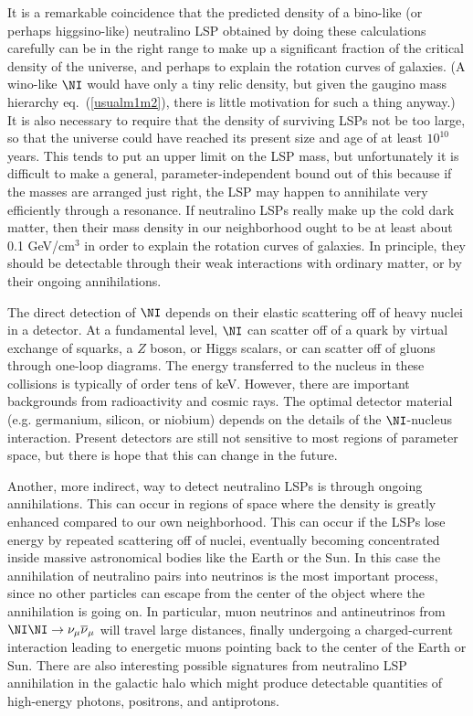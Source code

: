 It is a remarkable coincidence that the predicted density of
a bino-like (or perhaps higgsino-like) neutralino LSP obtained by
doing these calculations carefully can be in the right range to
make up a significant fraction of the critical density of the universe, 
and perhaps to
explain the rotation curves of galaxies.\cite{darkmatterreviews} (A
wino-like $\NI$ would
have only a tiny relic density, but given the gaugino mass hierarchy
eq.~(\ref{usualm1m2}), there is little motivation for such a thing
anyway.) It is also necessary to require that the density of
surviving LSPs not be too large, so that the universe could have
reached its present size and age of at least $10^{10}$ years.
This tends to put an upper limit on the LSP mass, but unfortunately
it is difficult to make a general, parameter-independent bound
out of this because if
the masses are arranged just right, the LSP may happen to
annihilate very efficiently through a resonance.
If neutralino LSPs really make up the cold dark matter,
then their mass density in our neighborhood ought to be
at least about 0.1 GeV/cm$^3$ in order to explain the rotation
curves of galaxies. In principle, they should be detectable through
their weak interactions with ordinary matter, or by their ongoing
annihilations.

The direct detection of $\NI$ depends on their elastic scattering
off of heavy nuclei in a detector. At a fundamental level, $\NI$
can scatter off of a quark by virtual exchange of squarks,
a $Z$ boson, or Higgs scalars, or can scatter off of gluons
through one-loop diagrams. The energy transferred to the nucleus
in these collisions is typically of order tens of keV. However,
there are important backgrounds from radioactivity and cosmic rays.
The optimal detector material (e.g. germanium, silicon, or
niobium) depends on the details of the $\NI$-nucleus interaction.
Present detectors are still not sensitive to most regions of parameter
space, but there is hope that this can change in the future.

Another, more indirect, way to detect neutralino LSPs is through
ongoing annihilations. This can occur
in regions of space where the
density
is greatly enhanced compared to our own neighborhood. This can
occur if the LSPs lose energy by repeated scattering off of nuclei,
eventually becoming concentrated inside massive astronomical bodies
like the Earth or the Sun. In this case the annihilation of neutralino
pairs into neutrinos is the most important process,
since no other particles can escape from the center of the object
where the annihilation is going on. In particular, muon neutrinos
and antineutrinos from
$\NI\NI \rightarrow \nu_\mu\overline\nu_\mu$
will travel large distances, finally undergoing a charged-current
interaction leading to energetic muons pointing back to the center of the
Earth or Sun. There are also interesting possible signatures from
neutralino LSP annihilation in the galactic halo which might produce
detectable quantities of high-energy photons, positrons, and
antiprotons.\cite{darkmatterreviews}

